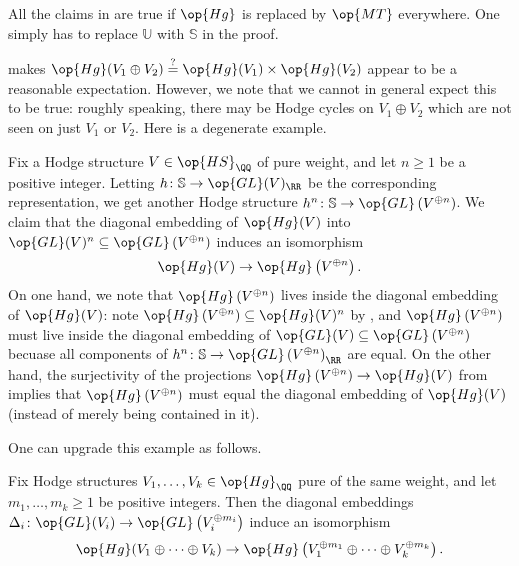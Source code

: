 \documentclass[../thesis.tex]{subfiles}
\begin{document}
\begin{remark}
	All the claims in  are true if $\op{Hg}$ is replaced by $\op{MT}$ everywhere. One simply has to replace $\mathbb U$ with $\mathbb S$ in the proof.
\end{remark}
 makes $\op{Hg}(V_1\oplus V_2)\stackrel?=\op{Hg}(V_1)\times\op{Hg}(V_2)$ appear to be a reasonable expectation. However, we note that we cannot in general expect this to be true: roughly speaking, there may be Hodge cycles on $V_1\oplus V_2$ which are not seen on just $V_1$ or $V_2$. Here is a degenerate example.
\begin{example} \label{ex:diagonal-hodge-group}
	Fix a Hodge structure $V\in\op{HS}_\QQ$ of pure weight, and let $n\ge1$ be a positive integer. Letting $h\colon\mathbb S\to\op{GL}(V)_\RR$ be the corresponding representation, we get another Hodge structure $h^{n}\colon\mathbb S\to\op{GL}\left(V^{\oplus n}\right)$. We claim that the diagonal embedding of $\op{Hg}(V)$ into $\op{GL}(V)^n\subseteq\op{GL}\left(V^{\oplus n}\right)$ induces an isomorphism
	\[\op{Hg}(V)\to\op{Hg}\left(V^{\oplus n}\right).\]
	On one hand, we note that $\op{Hg}\left(V^{\oplus n}\right)$ lives inside the diagonal embedding of $\op{Hg}(V)$: note $\op{Hg}\left(V^{\oplus n}\right)\subseteq\op{Hg}(V)^n$ by , and $\op{Hg}\left(V^{\oplus n}\right)$ must live inside the diagonal embedding of $\op{GL}(V)\subseteq\op{GL}\left(V^{\oplus n}\right)$ becuase all components of $h^n\colon\mathbb S\to\op{GL}\left(V^{\oplus n}\right)_\RR$ are equal. On the other hand, the surjectivity of the projections $\op{Hg}\left(V^{\oplus n}\right)\to\op{Hg}(V)$ from  implies that $\op{Hg}\left(V^{\oplus n}\right)$ must equal the diagonal embedding of $\op{Hg}(V)$ (instead of merely being contained in it).
\end{example}
One can upgrade this example as follows.
\begin{lemma}
	Fix Hodge structures $V_1,\ldots,V_k\in\op{Hg}_\QQ$ pure of the same weight, and let $m_1,\ldots,m_k\ge1$ be positive integers. Then the diagonal embeddings $\Delta_i\colon\op{GL}(V_i)\to\op{GL}\left(V_i^{\oplus m_i}\right)$ induce an isomorphism
	\[\op{Hg}(V_1\oplus\cdots\oplus V_k)\to\op{Hg}\left(V_1^{\oplus m_1}\oplus\cdots\oplus V_k^{\oplus m_k}\right).\]
\end{lemma}
\end{document}
